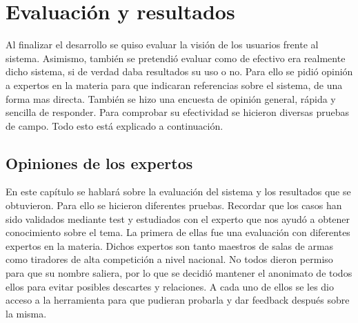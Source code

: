 \chapter{Evaluación y resultados}
\label{cap:Evaluación y resultados}

Al finalizar el desarrollo se quiso evaluar la visión de los usuarios frente al sistema.
Asimismo, también se pretendió evaluar como de efectivo era realmente dicho sistema,
si de verdad daba resultados su uso o no. Para ello se pidió opinión a expertos en la materia
para que indicaran referencias sobre el sistema, de una forma mas directa. También se hizo
una encuesta de opinión general, rápida y sencilla de responder. Para comprobar su efectividad
se hicieron diversas pruebas de campo. Todo esto está explicado a continuación.


\section{Opiniones de los expertos}

En este capítulo se hablará sobre la evaluación del sistema y los resultados que se obtuvieron.
Para ello se hicieron diferentes pruebas. Recordar que los casos han sido validados mediante
test y estudiados con el experto que nos ayudó a obtener conocimiento sobre el tema.
La primera de ellas fue una evaluación con diferentes
expertos en la materia. Dichos expertos son tanto maestros de salas de armas como tiradores
de alta competición a nivel nacional. No todos dieron permiso para que su nombre saliera, por
lo que se decidió mantener el anonimato de todos ellos para evitar posibles descartes y relaciones.
A cada uno de ellos se les dio acceso a la herramienta para que pudieran probarla y dar feedback
después sobre la misma.

